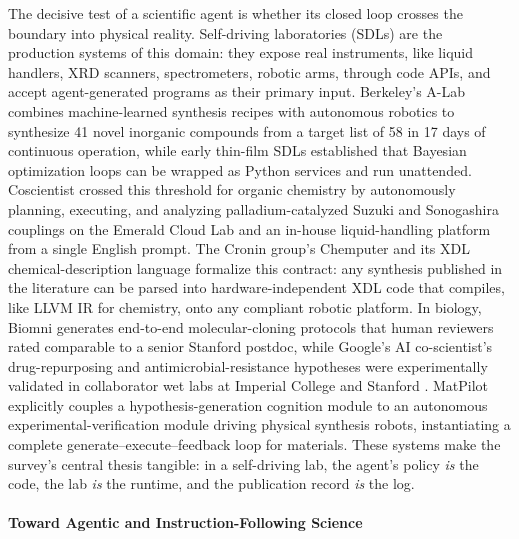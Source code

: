 \documentclass{llmxive}
\begin{document}
The decisive test of a scientific agent is whether its closed loop crosses the boundary into physical reality. Self-driving laboratories (SDLs) are the production systems of this domain: they expose real instruments, like liquid handlers, XRD scanners, spectrometers, robotic arms, through code APIs, and accept agent-generated programs as their primary input. Berkeley's A-Lab \citep{szymanski2023autonomous} combines machine-learned synthesis recipes with autonomous robotics to synthesize 41 novel inorganic compounds from a target list of 58 in 17 days of continuous operation, while early thin-film SDLs \citep{macleod2020selfdrivinglaboratoryaccelerateddiscovery} established that Bayesian optimization loops can be wrapped as Python services and run unattended. Coscientist \citep{boiko2023autonomous} crossed this threshold for organic chemistry by autonomously planning, executing, and analyzing palladium-catalyzed Suzuki and Sonogashira couplings on the Emerald Cloud Lab and an in-house liquid-handling platform from a single English prompt. The Cronin group's Chemputer and its XDL chemical-description language \citep{mehr2020universal} formalize this contract: any synthesis published in the literature can be parsed into hardware-independent XDL code that compiles, like LLVM IR for chemistry, onto any compliant robotic platform. In biology, Biomni \citep{huang2025biomni} generates end-to-end molecular-cloning protocols that human reviewers rated comparable to a senior Stanford postdoc, while Google's AI co-scientist's drug-repurposing and antimicrobial-resistance hypotheses were experimentally validated in collaborator wet labs at Imperial College and Stanford \citep{gottweis2025aicoscientist}. MatPilot \citep{ni2024matpilotllmenabledaimaterials} explicitly couples a hypothesis-generation cognition module to an autonomous experimental-verification module driving physical synthesis robots, instantiating a complete generate–execute–feedback loop for materials. These systems make the survey's central thesis tangible: in a self-driving lab, the agent's policy \textit{is} the code, the lab \textit{is} the runtime, and the publication record \textit{is} the log.

\paragraph{Toward Agentic and Instruction-Following Science}
\end{document}
